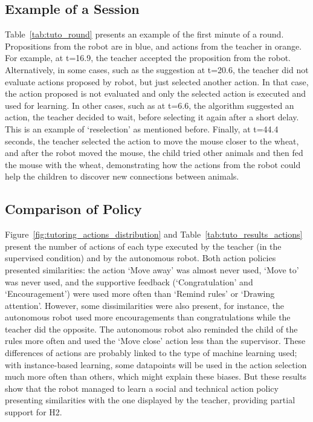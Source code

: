 \subsection{Example of a Session}

Table~\ref{tab:tuto_round} presents an example of the first minute of a round. Propositions from the robot are in blue, and actions from the teacher in orange. For example, at t=16.9, the teacher accepted the proposition from the robot. Alternatively, in some cases, such as the suggestion at t=20.6, the teacher did not evaluate actions proposed by robot, but just selected another action. In that case, the action proposed is not evaluated and only the selected action is executed and used for learning. In other cases, such as at t=6.6, the algorithm suggested an action, the teacher decided to wait, before selecting it again after a short delay. This is an example of `reselection' as mentioned before. Finally, at t=44.4 seconds, the teacher selected the action to move the mouse closer to the wheat, and after the robot moved the mouse, the child tried other animals and then fed the mouse with the wheat, demonstrating how the actions from the robot could help the children to discover new connections between animals.


\subsection{Comparison of Policy}

Figure~\ref{fig:tutoring_actions_distribution} and Table~\ref{tab:tuto_results_actions} present the number of actions of each type executed by the teacher (in the supervised condition) and by the autonomous robot. Both action policies presented similarities: the action `Move away' was almost never used, `Move to' was never used, and the supportive feedback (`Congratulation' and `Encouragement') were used more often than `Remind rules' or `Drawing attention'. However, some dissimilarities were also present, for instance, the autonomous robot used more encouragements than congratulations while the teacher did the opposite. The autonomous robot also reminded the child of the rules more often and used the `Move close' action less than the supervisor. These differences of actions are probably linked to the type of machine learning used; with instance-based learning, some datapoints will be used in the action selection much more often than others, which might explain these biases. But these results show that the robot managed to learn a social and technical action policy presenting similarities with the one displayed by the teacher, providing partial support for H2.

